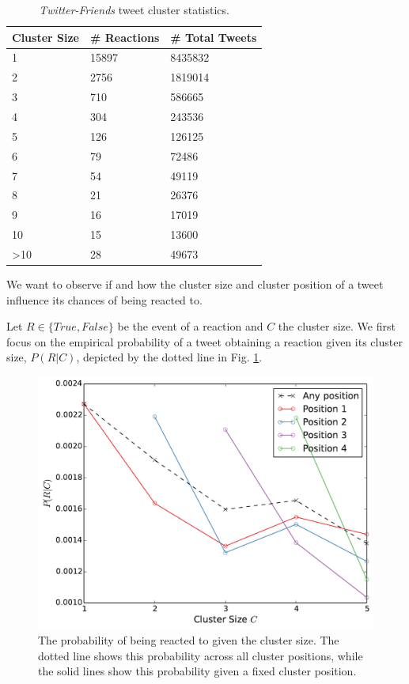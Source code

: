 \documentclass[onesided,letterpaper]{tufte-book}
\begin{document}
\begin{table}[h]
  \centering
  \selectfont
  \begin{tabular}{lll}
      \toprule
      \textbf{Cluster Size} & \textbf{\# Reactions} & \textbf{\# Total Tweets} \\
      \midrule
      1 &  15897 &   8435832 \\
      2 &  2756 &    1819014 \\
      3 &  710 & 586665 \\
      4 &  304 & 243536 \\
      5 &  126 & 126125 \\
      6 &  79 &  72486 \\
      7 &  54 &  49119 \\
      8 &  21 &  26376 \\
      9 &  16 &  17019 \\
      10 & 15 &  13600 \\
      >10 & 28 & 49673 \\
      \bottomrule
  \end{tabular}
  \caption{\textit{Twitter-Friends} tweet cluster statistics.}
  \label{table:cluster-statistics}
\end{table}

We want to observe if and how the cluster size and cluster position of a tweet influence its chances of being reacted to.

Let $R \in \{True, False\}$ be the event of a reaction and $C$ the cluster size. We first focus on the empirical probability of a tweet obtaining a reaction given its cluster size, $P(R | C)$, depicted by the dotted line in Fig. \ref{fig:retweet-distribution}.

\begin{figure}
    \includegraphics[width=\linewidth]{retweet_probability}
    \caption[Retweet probability for each cluster size.]{The probability of being reacted to given the cluster size. The dotted line shows this probability across all cluster positions, while the solid lines show this probability given a fixed cluster position.}
    \label{fig:retweet-distribution}
\end{figure}
\end{document}

